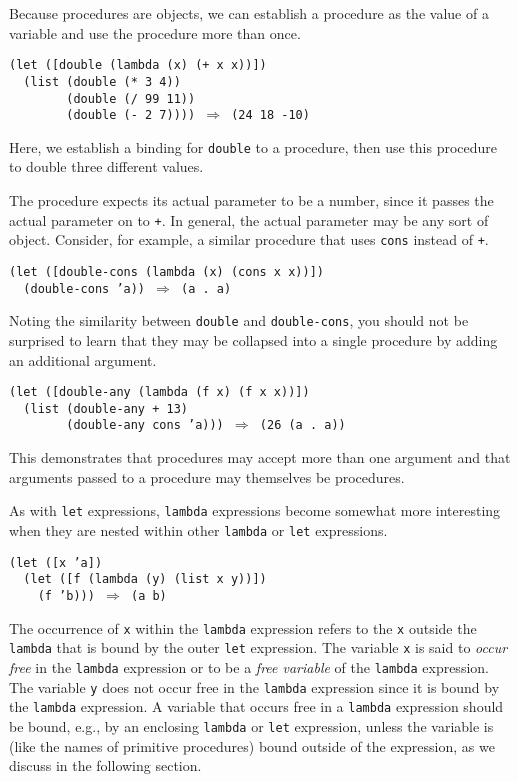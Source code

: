 Because procedures are objects, we can establish
a procedure as the value of a variable and use the procedure more
than once.\label{start_s65}


\begin{alltt}
(let ([double (lambda (x) (+ x x))])
  (list (double (* 3 4))
        (double (/ 99 11))
        (double (- 2 7)))) \(\Rightarrow\) (24 18 -10)
\end{alltt}


Here, we establish a binding for \texttt{double} to a procedure, then
use this procedure to double three different values.


The procedure expects its actual parameter to be a number, since
it passes the actual parameter on to \texttt{+}.
In general, the actual parameter may be any sort of object.
Consider, for example, a similar procedure that uses \texttt{cons}
instead of \texttt{+}.\label{start_s66}


\begin{alltt}
(let ([double-cons (lambda (x) (cons x x))])
  (double-cons 'a)) \(\Rightarrow\) (a . a)
\end{alltt}


Noting the similarity between \texttt{double} and \texttt{double-cons},
you should not be surprised to learn that they may be collapsed
into a single procedure by adding an additional argument.


\begin{alltt}
(let ([double-any (lambda (f x) (f x x))])
  (list (double-any + 13)
        (double-any cons 'a))) \(\Rightarrow\) (26 (a . a))
\end{alltt}


This demonstrates that procedures may accept more than
one argument and that arguments passed to a procedure may
themselves be procedures.


As with \texttt{let} expressions, \texttt{lambda} expressions become
somewhat more interesting when they are nested within other
\texttt{lambda} or \texttt{let} expressions.


\begin{alltt}
(let ([x 'a])
  (let ([f (lambda (y) (list x y))])
    (f 'b))) \(\Rightarrow\) (a b)
\end{alltt}


The occurrence of \texttt{x} within the \texttt{lambda} expression
refers to the \texttt{x} outside the \texttt{lambda} that is bound by
the outer \texttt{let} expression.
The variable \texttt{x} is said to \label{start_s67}\textit{occur free}
in the \texttt{lambda} expression or to be a
\label{start_s68}\textit{free variable} of the \texttt{lambda} expression.
The variable \texttt{y} does not occur free in the \texttt{lambda}
expression since it is bound by the \texttt{lambda} expression.
A variable that occurs free in a \texttt{lambda} expression
should be bound, e.g., by an enclosing \texttt{lambda} or \texttt{let}
expression, unless the variable is (like the names of primitive
procedures) bound outside of the expression, as we discuss in
the following section.


